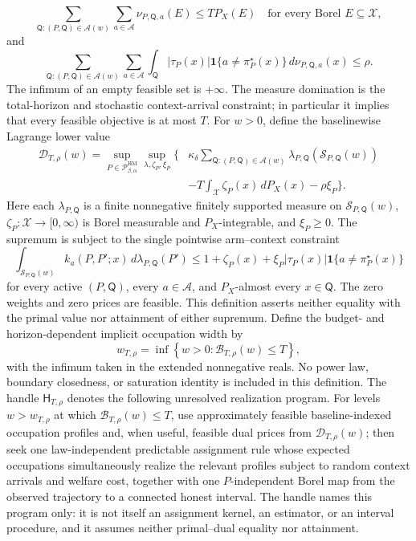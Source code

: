 \[
\sum_{\mathsf Q:(P,\mathsf Q)\in\mathscr A(w)}
\sum_{a\in\mathcal A}\nu_{P,\mathsf Q,a}(E)
\le T P_X(E)
\quad\text{for every Borel }E\subseteq\mathcal X,
\]
and
\[
\sum_{\mathsf Q:(P,\mathsf Q)\in\mathscr A(w)}
\sum_{a\in\mathcal A}
\int_{\mathsf Q}|\tau_P(x)|\mathbf 1\{a\ne\pi_P^\star(x)\}
\,d\nu_{P,\mathsf Q,a}(x)
\le\rho.
\]
The infimum of an empty feasible set is \(+\infty\).  The measure domination is the total-horizon and stochastic context-arrival constraint; in particular it implies that every feasible objective is at most \(T\).
For \(w>0\), define the baselinewise Lagrange lower value
\[
\begin{split}
\mathcal D_{T,\rho}(w)
=\sup_{P\in\mathcal P_{\beta,\alpha}^{\mathrm{HM}}}
\sup_{\lambda,\zeta_P,\xi_P}
\Bigg\{&\kappa_\delta
\sum_{\mathsf Q:(P,\mathsf Q)\in\mathscr A(w)}
\lambda_{P,\mathsf Q}(\mathcal S_{P,\mathsf Q}(w))\\
&-T\int_{\mathcal X}\zeta_P(x)\,dP_X(x)-\rho\xi_P\Bigg\}.
\end{split}
\]
Here each \(\lambda_{P,\mathsf Q}\) is a finite nonnegative finitely supported measure on \(\mathcal S_{P,\mathsf Q}(w)\), \(\zeta_P:\mathcal X\to[0,\infty)\) is Borel measurable and \(P_X\)-integrable, and \(\xi_P\ge0\).  The supremum is subject to the single pointwise arm--context constraint
\[
\int_{\mathcal S_{P,\mathsf Q}(w)}
k_a(P,P';x)\,d\lambda_{P,\mathsf Q}(P')
\le
1+\zeta_P(x)+\xi_P|\tau_P(x)|\mathbf 1\{a\ne\pi_P^\star(x)\}
\]
for every active \((P,\mathsf Q)\), every \(a\in\mathcal A\), and \(P_X\)-almost every \(x\in\mathsf Q\).  The zero weights and zero prices are feasible.  This definition asserts neither equality with the primal value nor attainment of either supremum.
Define the budget- and horizon-dependent implicit occupation width by
\[
w_{T,\rho}=\inf\left\{w>0:\mathcal B_{T,\rho}(w)\le T\right\},
\]
with the infimum taken in the extended nonnegative reals.  No power law, boundary closedness, or saturation identity is included in this definition.
The handle \(\mathsf H_{T,\rho}\) denotes the following unresolved realization program.  For levels \(w>w_{T,\rho}\) at which \(\mathcal B_{T,\rho}(w)\le T\), use approximately feasible baseline-indexed occupation profiles and, when useful, feasible dual prices from \(\mathcal D_{T,\rho}(w)\); then seek one law-independent predictable assignment rule whose expected occupations simultaneously realize the relevant profiles subject to random context arrivals and welfare cost, together with one \(P\)-independent Borel map from the observed trajectory to a connected honest interval.  The handle names this program only: it is not itself an assignment kernel, an estimator, or an interval procedure, and it assumes neither primal--dual equality nor attainment.
